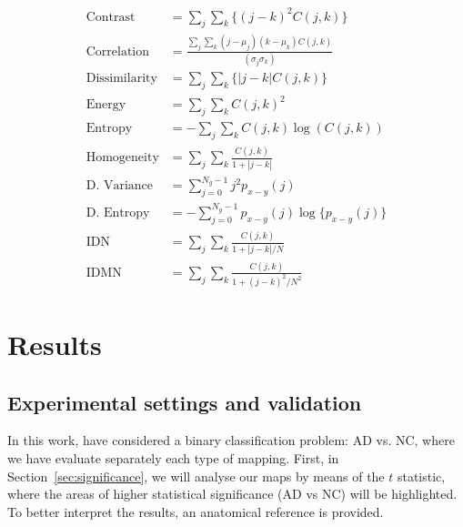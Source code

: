 \begin{align}\label{eq:contrast}
\text{Contrast} &= \textstyle\sum_j\sum_k\{(j-k)^2C(j,k)\}\\
\text{Correlation} &= \textstyle\frac{\sum_j\sum_k(j-\mu_j)(k-\mu_k)C(j,k)}{(\sigma_j\sigma_k)}\\ %
\text{Dissimilarity} & = \textstyle\sum_j\sum_k\{|j-k|C(j,k)\}\\
\text{Energy} &= \textstyle\sum_j\sum_k C(j,k)^2\\
\text{Entropy} &= - \textstyle\sum_j\sum_kC(j,k)\log(C(j,k))\\
\text{Homogeneity} &= \textstyle\sum_j\sum_k \frac{C(j,k)}{1+|j-k|}\\ %
\text{D. Variance} &= \textstyle\sum_{j=0}^{N_g-1}j^2 p_{x-y}(j)\\
\text{D. Entropy} &= -\textstyle\sum_{j=0}^{N_g-1} p_{x-y}(j)\log\{p_{x-y}(j)\}\\
\text{IDN} &= \textstyle\sum_j\sum_k \frac{C(j,k)}{1+|j-k|/N}\\ \label{eq:idmn}
\text{IDMN} &= \textstyle\sum_j\sum_k \frac{C(j,k)}{1+(j-k)^2/N^2}
\end{align}


\section{Results}

\subsection{Experimental settings and validation}\label{sec:experimental}
In this work, have considered a binary classification problem: AD vs. NC, where we have evaluate separately each type of mapping. First, in Section~\ref{sec:significance}, we will analyse our maps by means of the $t$ statistic, where the areas of higher statistical significance (AD vs NC) will be highlighted. To better interpret the results, an anatomical reference is provided.

